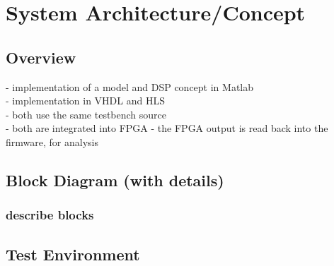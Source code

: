 \chapter{System Architecture/Concept}
\label{cha:SystemArchitecture/Concept}

  \section{Overview}


-  implementation of a model and DSP concept in Matlab \\
-  implementation in VHDL and HLS \\
-  both use the same testbench source \\
-  both are integrated into FPGA
-  the FPGA output is read back into the firmware, for analysis \\

  \section{Block Diagram (with details)}
    \subsection{describe blocks}

  \section{Test Environment}
